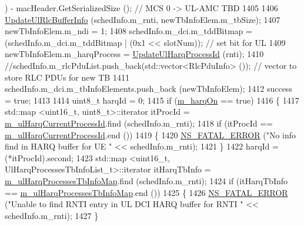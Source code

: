 \begin{DoxyCode}
      ) - macHeader.GetSerializedSize (); \textcolor{comment}{// MCS 0 -> UL-AMC TBD}
1405 
1406                 \hyperlink{classns3_1_1MmWaveRrMacScheduler_a57725a4bd9ba6cfe462d804a131c0255}{UpdateUlRlcBufferInfo} (schedInfo.m\_rnti, newTbInfoElem.m\_tbSize);
1407                 newTbInfoElem.m\_ndi = 1;
1408                 schedInfo.m\_dci.m\_tddBitmap = (schedInfo.m\_dci.m\_tddBitmap | (0x1 << slotNum)); \textcolor{comment}{// set bit
       for UL}
1409                 newTbInfoElem.m\_harqProcess = \hyperlink{classns3_1_1MmWaveRrMacScheduler_addd7405298c9c95bf87ef2c32c3a477b}{UpdateUlHarqProcessId} (rnti);
1410                 \textcolor{comment}{//schedInfo.m\_rlcPduList.push\_back(std::vector<RlcPduInfo> ());  // vector to store RLC
       PDUs for new TB}
1411                 schedInfo.m\_dci.m\_tbInfoElements.push\_back (newTbInfoElem);
1412                 success = \textcolor{keyword}{true};
1413 
1414                 uint8\_t harqId = 0;
1415                 \textcolor{keywordflow}{if} (\hyperlink{classns3_1_1MmWaveRrMacScheduler_ad8bb79b5853000b363b42a158633a942}{m\_harqOn} == \textcolor{keyword}{true})
1416                 \{
1417                         std::map <uint16\_t, uint8\_t>::iterator itProcId = 
      \hyperlink{classns3_1_1MmWaveRrMacScheduler_a9d9d27b704770d34cb1ce158e9ed51ba}{m\_ulHarqCurrentProcessId}.find (schedInfo.m\_rnti);
1418                         \textcolor{keywordflow}{if} (itProcId == \hyperlink{classns3_1_1MmWaveRrMacScheduler_a9d9d27b704770d34cb1ce158e9ed51ba}{m\_ulHarqCurrentProcessId}.end ())
1419                         \{
1420                                 \hyperlink{group__fatal_ga5131d5e3f75d7d4cbfd706ac456fdc85}{NS\_FATAL\_ERROR} (\textcolor{stringliteral}{"No info find in HARQ buffer for UE "} << 
      schedInfo.m\_rnti);
1421                         \}
1422                         harqId = (*itProcId).second;
1423                         std::map <uint16\_t, UlHarqProcessesTbInfoList\_t>::iterator itHarqTbInfo = 
      \hyperlink{classns3_1_1MmWaveRrMacScheduler_a3fb20c8b0644fdd05f5545ec0b685b10}{m\_ulHarqProcessesTbInfoMap}.find (schedInfo.m\_rnti);
1424                         \textcolor{keywordflow}{if} (itHarqTbInfo == \hyperlink{classns3_1_1MmWaveRrMacScheduler_a3fb20c8b0644fdd05f5545ec0b685b10}{m\_ulHarqProcessesTbInfoMap}.end ())
1425                         \{
1426                                 \hyperlink{group__fatal_ga5131d5e3f75d7d4cbfd706ac456fdc85}{NS\_FATAL\_ERROR} (\textcolor{stringliteral}{"Unable to find RNTI entry in UL DCI HARQ
       buffer for RNTI "} << schedInfo.m\_rnti);
1427                         \}

\end{DoxyCode}
